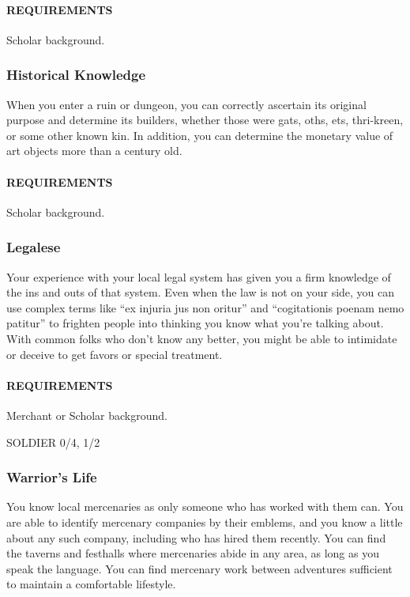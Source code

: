     \paragraph{REQUIREMENTS} Scholar background.

    \subsubsection{Historical Knowledge} \label{feat::historicalknowledge}
    When you enter a ruin or dungeon, you can correctly ascertain its original purpose and determine its builders, whether those were gats, oths, ets, thri-kreen, or some other known kin.
    In addition, you can determine the monetary value of art objects more than a century old.
    \paragraph{REQUIREMENTS} Scholar background.

    \subsubsection{Legalese} \label{feat::legalese}
    Your experience with your local legal system has given you a firm knowledge of the ins and outs of that system.
    Even when the law is not on your side, you can use complex terms like ``ex injuria jus non oritur'' and ``cogitationis poenam nemo patitur'' to frighten people into thinking you know what you're talking about.
    With common folks who don't know any better, you might be able to intimidate or deceive to get favors or special treatment.
    \paragraph{REQUIREMENTS} Merchant or Scholar background.

SOLDIER 0/4, 1/2
    \subsubsection{Warrior's Life} \label{feat::warriorslife}
    You know local mercenaries as only someone who has worked with them can.
    You are able to identify mercenary companies by their emblems, and you know a little about any such company, including who has hired them recently.
    You can find the taverns and festhalls where mercenaries abide in any area, as long as you speak the language.
    You can find mercenary work between adventures sufficient to maintain a comfortable lifestyle.
